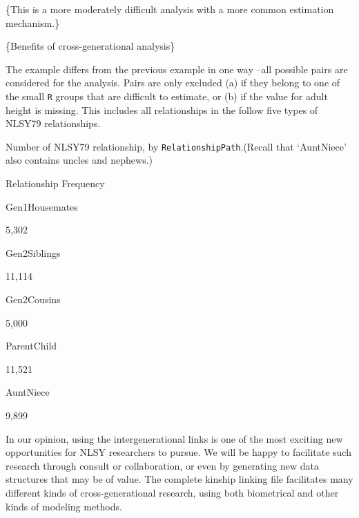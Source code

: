 \documentclass[smallextended]{svjour3}       %
\newenvironment{Shaded}{\begin{snugshade}}{\end{snugshade}}
\newcommand{\DataTypeTok}[1]{\textcolor[rgb]{0.13,0.29,0.53}{#1}}
\newcommand{\KeywordTok}[1]{\textcolor[rgb]{0.13,0.29,0.53}{\textbf{#1}}}
\newcommand{\NormalTok}[1]{#1}
\newcommand{\OperatorTok}[1]{\textcolor[rgb]{0.81,0.36,0.00}{\textbf{#1}}}
\newcommand{\StringTok}[1]{\textcolor[rgb]{0.31,0.60,0.02}{#1}}
\begin{document}
\{This is a more moderately difficult analysis with a more common
estimation mechanism.\}

\{Benefits of cross-generational analysis\}

The example differs from the previous example in one way --all possible
pairs are considered for the analysis. Pairs are only excluded (a) if
they belong to one of the small \texttt{R} groups that are difficult to
estimate, or (b) if the value for adult height is missing. This includes
all  relationships in the follow
five types of NLSY79 relationships.

\begin{Shaded}
\end{Shaded}

Number of NLSY79 relationship, by \texttt{RelationshipPath}.(Recall that
`AuntNiece' also contains uncles and nephews.)

Relationship Frequency

Gen1Housemates

5,302

Gen2Siblings

11,114

Gen2Cousins

5,000

ParentChild

11,521

AuntNiece

9,899

In our opinion, using the intergenerational links is one of the most
exciting new opportunities for NLSY researchers to pursue. We will be
happy to facilitate such research through consult or collaboration, or
even by generating new data structures that may be of value. The
complete kinship linking file facilitates many different kinds of
cross-generational research, using both biometrical and other kinds of
modeling methods.
\end{document}

